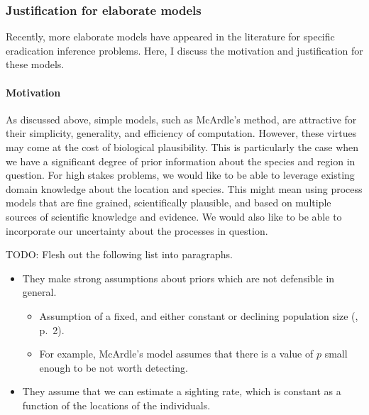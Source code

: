 \documentclass[
]{book}
\providecommand{\tightlist}{%
  \setlength{\itemsep}{0pt}\setlength{\parskip}{0pt}}
\begin{document}
\hypertarget{justification-for-elaborate-models}{%
\subsubsection{Justification for elaborate models}\label{justification-for-elaborate-models}}

Recently, more elaborate models have appeared in the literature for specific eradication inference problems. Here, I discuss the motivation and justification for these models.

\hypertarget{motivation}{%
\paragraph{Motivation}\label{motivation}}

As discussed above, simple models, such as McArdle's method, are attractive for their simplicity, generality, and efficiency of computation. However, these virtues may come at the cost of biological plausibility. This is particularly the case when we have a significant degree of prior information about the species and region in question. For high stakes problems, we would like to be able to leverage existing domain knowledge about the location and species. This might mean using process models that are fine grained, scientifically plausible, and based on multiple sources of scientific knowledge and evidence. We would also like to be able to incorporate our uncertainty about the processes in question.

TODO: Flesh out the following list into paragraphs.

\begin{itemize}
\tightlist
\item
  They make strong assumptions about priors which are not defensible in general.

  \begin{itemize}
  \tightlist
  \item
    Assumption of a fixed, and either constant or declining population size (\citet{caley2015}, p.~2).
  \item
    For example, McArdle's model assumes that there is a value of \(p\) small enough to be not worth detecting.
  \end{itemize}
\item
  They assume that we can estimate a sighting rate, which is constant as a function of the locations of the individuals.
\end{itemize}
\end{document}
